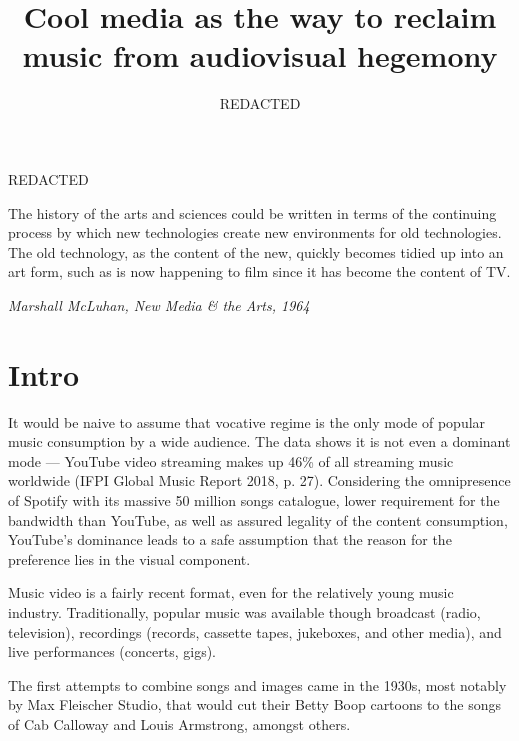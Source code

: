 \documentclass[a4paper, 11pt]{article}
\begin{document}
\begin{titlepage}
	\title{\textbf{Cool media as the way to reclaim \\music from audiovisual hegemony}}
	\author{REDACTED}
	\date{}
	\maketitle
	\thispagestyle{empty}
	\centering
	\vfill
	REDACTED
	\newpage
\end{titlepage}





\epigraph{
	The history of the arts and sciences could be written in terms of the continuing process by which new technologies create new environments for old technologies. The old technology, as the content of the new, quickly becomes tidied up into an art form, such as is now happening to film since it has become the content of TV.}{\textit{Marshall McLuhan, New Media \& the Arts, 1964}}

\onehalfspacing


\section{Intro}
It would be naive to assume that vocative regime is the only mode of popular music consumption by a wide audience. The data shows it is not even a dominant mode — YouTube video streaming makes up 46\% of all streaming music worldwide (IFPI Global Music Report 2018, p. 27). Considering the omnipresence of Spotify with its massive 50 million songs catalogue, lower requirement for the bandwidth than YouTube, as well as assured legality of the content consumption, YouTube's dominance leads to a safe assumption that the reason for the preference lies in the visual component.


Music video is a fairly recent format, even for the relatively young music industry. Traditionally, popular music was available though broadcast (radio, television), recordings (records, cassette tapes, jukeboxes, and other media), and live performances (concerts, gigs).

The first attempts to combine songs and images came in the 1930s, most notably by Max Fleischer Studio, that would cut their Betty Boop cartoons to the songs of Cab Calloway and Louis Armstrong, amongst others.
\end{document}
